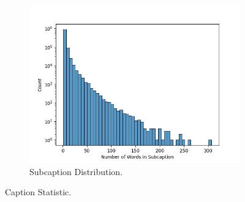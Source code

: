 \begin{figure}[tp]
  \hfill
  \begin{subfigure}{0.45\textwidth}
    \centering
    \includegraphics[width=\textwidth]{figs/data-statistic/sub_caption_lens.jpg}
    \caption{Subcaption Distribution.}
    \label{fig:subfig2}
  \end{subfigure}

  \caption{Caption Statistic.}
  \label{fig:caption-statistic}
\end{figure}